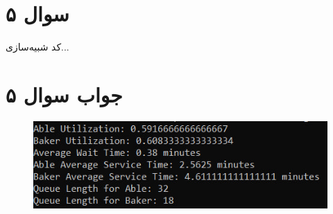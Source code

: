 \section*{سوال ۵}

کد شبیه‌سازی...
\section*{جواب سوال ۵}

\begin{figure}[H]
	\centering
	\includegraphics{pic1.jpg}
	\label{fig:label4}
\end{figure}